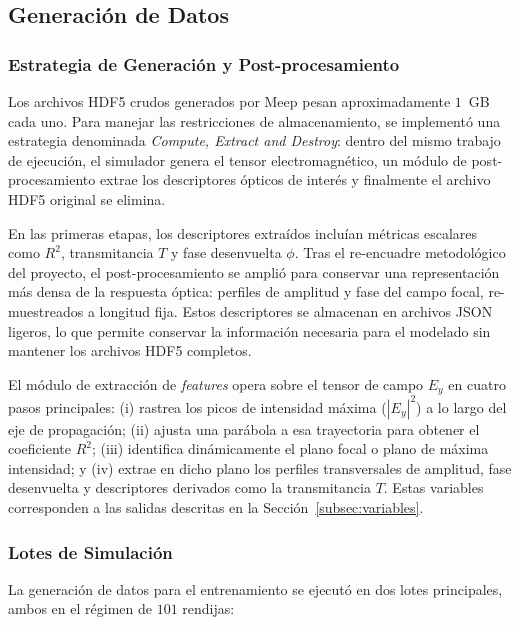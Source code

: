 \subsection{Generación de Datos}\label{subsec:generacion}

\subsubsection{Estrategia de Generación y Post-procesamiento}

Los archivos HDF5 crudos generados por Meep pesan aproximadamente $1$~GB cada uno. Para manejar las restricciones de almacenamiento, se implementó una estrategia denominada \textit{Compute, Extract and Destroy}: dentro del mismo trabajo de ejecución, el simulador genera el tensor electromagnético, un módulo de post-procesamiento extrae los descriptores ópticos de interés y finalmente el archivo HDF5 original se elimina.

En las primeras etapas, los descriptores extraídos incluían métricas escalares como $R^2$, transmitancia $T$ y fase desenvuelta $\phi$. Tras el re-encuadre metodológico del proyecto, el post-procesamiento se amplió para conservar una representación más densa de la respuesta óptica: perfiles de amplitud y fase del campo focal, re-muestreados a longitud fija. Estos descriptores se almacenan en archivos JSON ligeros, lo que permite conservar la información necesaria para el modelado sin mantener los archivos HDF5 completos.

El módulo de extracción de \textit{features} opera sobre el tensor de campo $E_y$ en cuatro pasos principales: (i) rastrea los picos de intensidad máxima ($|E_y|^2$) a lo largo del eje de propagación; (ii) ajusta una parábola a esa trayectoria para obtener el coeficiente $R^2$; (iii) identifica dinámicamente el plano focal o plano de máxima intensidad; y (iv) extrae en dicho plano los perfiles transversales de amplitud, fase desenvuelta y descriptores derivados como la transmitancia $T$. Estas variables corresponden a las salidas descritas en la Sección~\ref{subsec:variables}.


\subsubsection{Lotes de Simulación}

La generación de datos para el entrenamiento se ejecutó en dos lotes principales, ambos en el régimen de $101$ rendijas:


